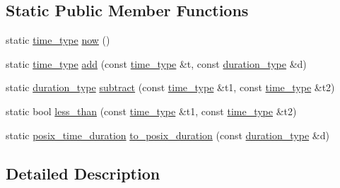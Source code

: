 \subsection*{Static Public Member Functions}
\begin{DoxyCompactItemize}
\item 
static \hyperlink{structasio_1_1detail_1_1chrono__time__traits_a19c14f4d45a8b164d2ea4590eebc1c10}{time\+\_\+type} \hyperlink{structasio_1_1detail_1_1chrono__time__traits_a338cedf2fb1814b9e1fa6f841d643945}{now} ()
\item 
static \hyperlink{structasio_1_1detail_1_1chrono__time__traits_a19c14f4d45a8b164d2ea4590eebc1c10}{time\+\_\+type} \hyperlink{structasio_1_1detail_1_1chrono__time__traits_acd393376947e8f72bda0defba4e35929}{add} (const \hyperlink{structasio_1_1detail_1_1chrono__time__traits_a19c14f4d45a8b164d2ea4590eebc1c10}{time\+\_\+type} \&t, const \hyperlink{structasio_1_1detail_1_1chrono__time__traits_a7f122a7cb603e7516bb6595016960775}{duration\+\_\+type} \&d)
\item 
static \hyperlink{structasio_1_1detail_1_1chrono__time__traits_a7f122a7cb603e7516bb6595016960775}{duration\+\_\+type} \hyperlink{structasio_1_1detail_1_1chrono__time__traits_acdcf3583f2ab08dcfe3af9c4455f85ae}{subtract} (const \hyperlink{structasio_1_1detail_1_1chrono__time__traits_a19c14f4d45a8b164d2ea4590eebc1c10}{time\+\_\+type} \&t1, const \hyperlink{structasio_1_1detail_1_1chrono__time__traits_a19c14f4d45a8b164d2ea4590eebc1c10}{time\+\_\+type} \&t2)
\item 
static bool \hyperlink{structasio_1_1detail_1_1chrono__time__traits_a12702d45a542fac5c4558be6784f6de1}{less\+\_\+than} (const \hyperlink{structasio_1_1detail_1_1chrono__time__traits_a19c14f4d45a8b164d2ea4590eebc1c10}{time\+\_\+type} \&t1, const \hyperlink{structasio_1_1detail_1_1chrono__time__traits_a19c14f4d45a8b164d2ea4590eebc1c10}{time\+\_\+type} \&t2)
\item 
static \hyperlink{classasio_1_1detail_1_1chrono__time__traits_1_1posix__time__duration}{posix\+\_\+time\+\_\+duration} \hyperlink{structasio_1_1detail_1_1chrono__time__traits_a892a428f4ba5ee4ef390838ad440784c}{to\+\_\+posix\+\_\+duration} (const \hyperlink{structasio_1_1detail_1_1chrono__time__traits_a7f122a7cb603e7516bb6595016960775}{duration\+\_\+type} \&d)
\end{DoxyCompactItemize}


\subsection{Detailed Description}
